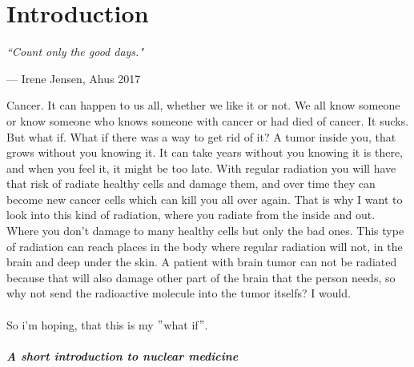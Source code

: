 \documentclass[twoside,english]{uiofysmaster/uiofysmaster}
\begin{document}
\chapter{Introduction}

\epigraph{\itshape ``Count only the good days."}{--- \textup{ Irene Jensen}, Ahus 2017}
 


Cancer. It can happen to us all, whether we like it or not. We all know someone or know someone who knows someone with cancer or had died of cancer. It sucks. But what if. What if there was a way to get rid of it? A tumor inside you, that grows without you knowing it. It can take years without you knowing it is there, and when you feel it, it might be too late. With regular radiation you will have that risk of radiate healthy cells and damage them, and over time they can become new cancer cells which can kill you all over again. That is why I want to look into this kind of radiation, where you radiate from the inside and out. Where you don’t damage to many healthy cells but only the bad ones. This type of radiation can reach places in the body where regular radiation will not, in the brain and deep under the skin. A patient with brain tumor can not be radiated because that will also damage other part of the brain that the person needs, so why not send the radioactive molecule into the tumor itselfs? I would.
\\
\\
So i’m hoping, that this is my $"$what if$"$.






\paragraph{A short introduction to nuclear medicine} \mbox{}




\end{document}
